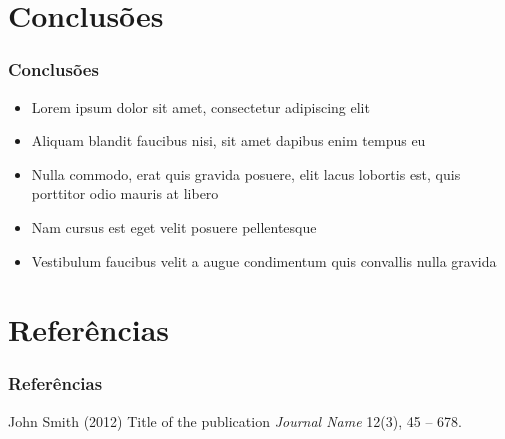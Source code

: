 \documentclass{beamer}
\begin{document}
\section{Conclusões}
\begin{frame}
\frametitle{Conclusões}

\begin{itemize}
\item Lorem ipsum dolor sit amet, consectetur adipiscing elit
\item Aliquam blandit faucibus nisi, sit amet dapibus enim tempus eu
\item Nulla commodo, erat quis gravida posuere, elit lacus lobortis est, quis porttitor odio mauris at libero
\item Nam cursus est eget velit posuere pellentesque
\item Vestibulum faucibus velit a augue condimentum quis convallis nulla gravida
\end{itemize}

\end{frame}

\section{Referências}
\begin{frame}
\frametitle{Referências}
\footnotesize{
\begin{thebibliography}{99} %
 John Smith (2012)
\newblock Title of the publication
\newblock \emph{Journal Name} 12(3), 45 -- 678.
\end{thebibliography}
}
\end{frame}


\end{document}
